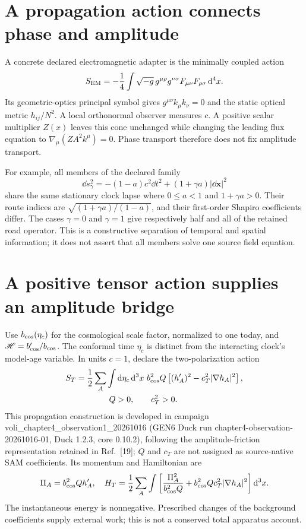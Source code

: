 \section{A propagation action connects phase and amplitude}
A concrete declared electromagnetic adapter is the minimally coupled action
\[
 S_{\rm EM}=-\frac14\int\sqrt{-g}\,g^{\mu\rho}g^{\nu\sigma}
 F_{\mu\nu}F_{\rho\sigma}\,\mathrm{d}^4x.
\]
Its geometric-optics principal symbol gives $g^{\mu\nu}k_\mu k_\nu=0$ and the static optical metric $h_{ij}/N^2$. A local orthonormal observer measures $c$. A positive scalar multiplier $Z(x)$ leaves this cone unchanged while changing the leading flux equation to $\nabla_\mu(ZA^2k^\mu)=0$. Phase transport therefore does not fix amplitude transport.

For example, all members of the declared family
\[
 \dd s_\gamma^2=-(1-a)c^2\dd t^2+(1+\gamma a)|\dd\bm x|^2
\]
share the same stationary clock lapse where $0\le a<1$ and $1+\gamma a>0$. Their route indices are $\sqrt{(1+\gamma a)/(1-a)}$, and their first-order Shapiro coefficients differ. The cases $\gamma=0$ and $\gamma=1$ give respectively half and all of the retained road operator. This is a constructive separation of temporal and spatial information; it does not assert that all members solve one source field equation.

\section{A positive tensor action supplies an amplitude bridge}
Use $b_{\rm cos}(\eta_c)$ for the cosmological scale factor, normalized to one today, and $\mathscr H=b_{\rm cos}'/b_{\rm cos}$. The conformal time $\eta_c$ is distinct from the interacting clock's model-age variable. In units $c=1$, declare the two-polarization action
\[
\begin{aligned}
 S_T&=\frac12\sum_A\int\mathrm{d}\eta_c\,\mathrm{d}^3x\ b_{\rm cos}^2Q
 \left[(h_A')^2-c_T^2|\nabla h_A|^2\right],\\
 &\hspace{4em}Q>0,\qquad c_T^2>0.
\end{aligned}
\]
This propagation construction is developed in campaign voli\_chapter4\_observation1\_20261016 (GEN6 Duck run chapter4-observation-20261016-01, Duck 1.2.3, core 0.10.2), following the amplitude-friction representation retained in Ref.~[19]; $Q$ and $c_T$ are not assigned as source-native SAM coefficients. Its momentum and Hamiltonian are
\[
 \Pi_A=b_{\rm cos}^2Qh_A',\quad
 H_T=\frac12\sum_A\int\left[
 \frac{\Pi_A^2}{b_{\rm cos}^2Q}+b_{\rm cos}^2Qc_T^2|\nabla h_A|^2
 \right]\mathrm{d}^3x.
\]
The instantaneous energy is nonnegative. Prescribed changes of the background coefficients supply external work; this is not a conserved total apparatus account.

